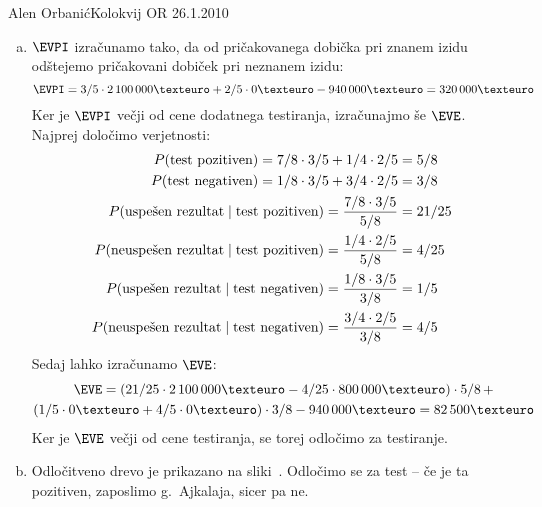 \begin{naloga}{Alen Orbanić}{Kolokvij OR 26.1.2010}
\begin{odgovor}
\begin{enumerate}[(a)]
\item $\EVPI$ izračunamo tako,
da od pričakovanega dobička pri znanem izidu
odštejemo pričakovani dobiček pri neznanem izidu:
$$
\EVPI = 3/5 \cdot 2\,100\,000 € + 2/5 \cdot 0€ - 940\,000 € = 320\,000 €
$$
Ker je $\EVPI$ večji od cene dodatnega testiranja,
izračunajmo še $\EVE$.
Najprej določimo verjetnosti:
\begin{align*}
P(\text{test pozitiven}) = 7/8 \cdot 3/5 + 1/4 \cdot 2/5 &= 5/8 \\
P(\text{test negativen}) = 1/8 \cdot 3/5 + 3/4 \cdot 2/5 &= 3/8 \\
P(\text{uspešen rezultat} \;|\; \text{test pozitiven}) =
{7/8 \cdot 3/5 \over 5/8} &= 21/25 \\
P(\text{neuspešen rezultat} \;|\; \text{test pozitiven}) =
{1/4 \cdot 2/5 \over 5/8} &= 4/25 \\
P(\text{uspešen rezultat} \;|\; \text{test negativen}) =
{1/8 \cdot 3/5 \over 3/8} &= 1/5 \\
P(\text{neuspešen rezultat} \;|\; \text{test negativen}) =
{3/4 \cdot 2/5 \over 3/8} &= 4/5
\end{align*}
Sedaj lahko izračunamo $\EVE$:
\begin{multline*}
\EVE = (21/25 \cdot 2\,100\,000 € - 4/25 \cdot 800\,000 €) \cdot 5/8 \, + \\
(1/5 \cdot 0 € + 4/5 \cdot 0 €) \cdot 3/8 - 940\,000 € = 82\,500 €
\end{multline*}
Ker je $\EVE$ večji od cene testiranja, se torej odločimo za testiranje.

\item Odločitveno drevo je prikazano na sliki~.
Odločimo se za test -- če je ta pozitiven, zaposlimo g.~Ajkalaja, sicer pa ne.
\end{enumerate}

\begin{slika}
\end{slika}

\begin{slika}
\end{slika}
\end{odgovor}
\end{naloga}
